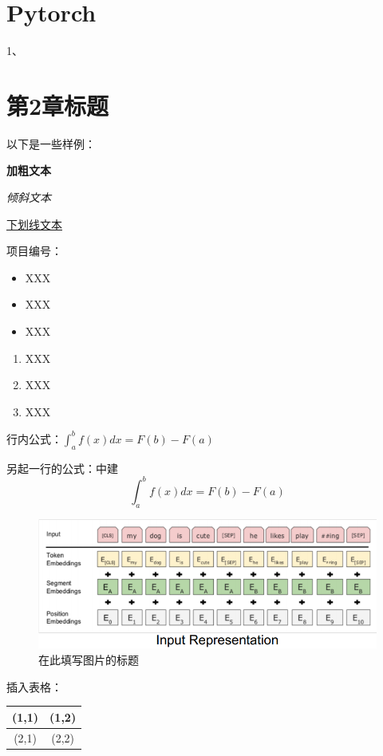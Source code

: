 \documentclass{article}
\begin{document}
\begin{CJK}{UTF8}{gbsn}
\section{Pytorch}
1、
\section{第2章标题}

以下是一些样例：

\textbf{加粗文本}

\textit{倾斜文本}

\underline{下划线文本}

项目编号：

\begin{itemize}
    \item XXX
    \item XXX
    \item XXX
\end{itemize}

\begin{enumerate}
    \item XXX
    \item XXX
    \item XXX
\end{enumerate}

行内公式：$\int_a^b f(x)dx = F(b)-F(a)$

另起一行的公式：中建
\begin{equation}
    \int_a^b f(x)dx = F(b)-F(a)
\end{equation}
\begin{figure}[h]
	\centering
	\includegraphics[scale=0.9]{example.png}
	\caption{在此填写图片的标题}
\end{figure}



插入表格：
\begin{tabular}{|c|c|}%
\hline  %
(1,1)&(1,2)\\
\hline  %
(2,1)&(2,2)\\
\hline %
\end{tabular}


\end{CJK}
\end{document}
